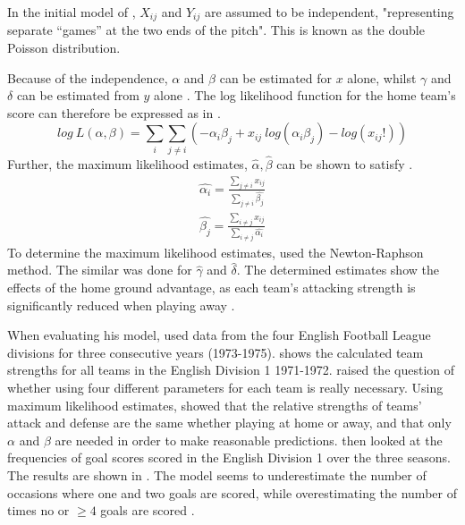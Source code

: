 In the initial model of \citet{bib:maher-1982}, $X_{ij}$  and $Y_{ij}$ are assumed to be independent, "representing separate “games” at the two ends of the pitch". This is known as the double Poisson distribution.

Because of the independence, $\alpha$ and $\beta$ can be estimated for $x$ alone, whilst $\gamma$ and $\delta$ can be estimated from $y$ alone \citep{bib:maher-1982}. The log likelihood function for the home team's score can therefore be expressed as in .
\begin{equation}
    log\ L(\alpha, \beta) = \sum_{i} \sum_{j \neq i} (-\alpha_{i} \beta_{j} + x_{ij}\ log(\alpha_{i}\beta_{j}) - log(x_{ij}!))
    \label{eq:maher-log-likelihood}
\end{equation}
Further, the maximum likelihood estimates, $\hat{\alpha}, \hat{\beta}$ can be shown to satisfy  \citep{bib:maher-1982}.
\begin{equation}
    \begin{aligned}
        \hat{\alpha_{i}} = \frac{\sum_{j \neq i} x_{ij}}{\sum_{j \neq i} \hat{\beta_{j}}} \\
        \hat{\beta_{j}} = \frac{\sum_{i \neq j} x_{ij}}{\sum_{i \neq j} \hat{\alpha_{i}}}
    \end{aligned}
    \label{eq:maher-maximum-likelihood-estimates}
\end{equation}
To determine the maximum likelihood estimates, \citet{bib:maher-1982} used the Newton-Raphson method. The similar was done for $\hat{\gamma}$ and $\hat{\delta}$. The determined estimates show the effects of the home ground advantage, as each team's attacking strength is significantly reduced when playing away \citep{bib:maher-1982}.

When evaluating his model, \citet{bib:maher-1982} used data from the four English Football League divisions for three consecutive years (1973-1975).  shows the calculated team strengths for all teams in the English Division 1 1971-1972. \citet{bib:maher-1982} raised the question of whether using four different parameters for each team is really necessary. Using maximum likelihood estimates, \citet{bib:maher-1982} showed that the relative strengths of teams' attack and defense are the same whether playing at home or away, and that only $\alpha$ and $\beta$ are needed in order to make reasonable predictions. \citet{bib:maher-1982} then looked at the frequencies of goal scores scored in the English Division 1 over the three seasons. The results are shown in . The model seems to underestimate the number of occasions where one and two goals are scored, while overestimating the number of times no or $\geq 4$ goals are scored \citep{bib:maher-1982}.

